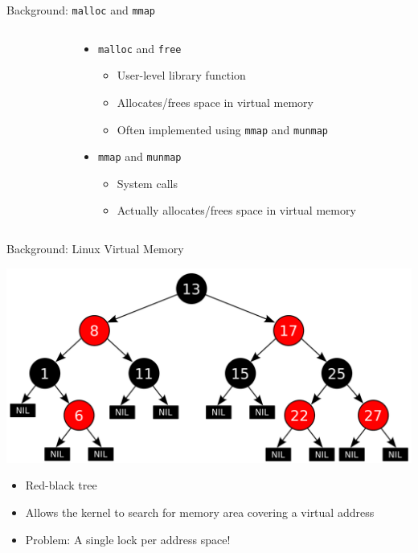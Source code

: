 \documentclass[aspectratio=169]{beamer}
\newcommand{\bi}{\begin{itemize}}
\newcommand{\ei}{\end{itemize}}
\begin{document}
\begin{frame}{Background: \texttt{malloc} and \texttt{mmap}}
\begin{columns}[T]
\begin{column}{0.2\textwidth}
    \end{column}
    \begin{column}{0.8\textwidth}
      \bi
    \item \texttt{malloc} and \texttt{free}
      \bi
    \item User-level library function
    \item Allocates/frees space in virtual memory
    \item Often implemented using \texttt{mmap} and \texttt{munmap}
      \ei
    \item \texttt{mmap} and \texttt{munmap}
      \bi
    \item System calls
    \item Actually allocates/frees space in virtual memory
      \ei
      \ei
    \end{column}
  \end{columns}
\end{frame}



\begin{frame}{Background: Linux Virtual Memory}
  \begin{center}
    \includegraphics[scale=0.2]{./figures/Red-black_tree.png}
  \end{center}
    \bi
    \item Red-black tree
    \item Allows the kernel to search for memory area covering a virtual address
      \pause
    \item {\color{red}Problem: A single lock per address space!}
    \ei
\end{frame}
\end{document}
